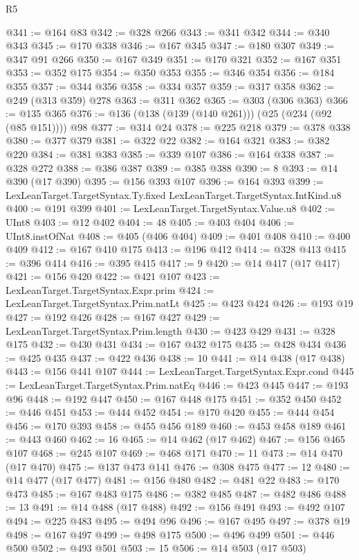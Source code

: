 \begin{lexlean}{R5}
\begin{coremodule}
{{{{{{{{{{{{{{{{{{{{{{{{{{{{{{{{{{{{{{{{{{{{{{{{{{{{{{{{{{{{{{@341 := @164 @83
@342 := @328 @266
@343 := @341 @342
@344 := @340 @343
@345 := @170 @338
@346 := @167 @345
@347 := @180 @307
@349 := @347 @91 @266
@350 := @167 @349
@351 := @170 @321
@352 := @167 @351
@353 := @352 @175
@354 := @350 @353
@355 := @346 @354
@356 := @184 @355
@357 := @344 @356
@358 := @334 @357
@359 := @317 @358
@362 := @249 (@313 @359) @278
@363 := @311 @362
@365 := @303 (@306 @363)
@366 := @135 @365
@376 := @136 (@138 (@139 (@140 @261))) (@25 (@234 (@92 (@85 @151)))) @98
@377 := @314 @24
@378 := @225 @218
@379 := @378 @338
@380 := @377 @379
@381 := @322 @22
@382 := @164 @321
@383 := @382 @220
@384 := @381 @383
@385 := @339 @107
@386 := @164 @338
@387 := @328 @272
@388 := @386 @387
@389 := @385 @388
@390 := 8
@393 := @14 @390 (@17 @390)
@395 := @156 @393 @107
@396 := @164 @393
@399 := LexLeanTarget.TargetSyntax.Ty.fixed LexLeanTarget.TargetSyntax.IntKind.u8
@400 := @191 @399
@401 := LexLeanTarget.TargetSyntax.Value.u8
@402 := UInt8
@403 := @12 @402
@404 := 48
@405 := @403 @404
@406 := UInt8.instOfNat
@408 := @405 (@406 @404)
@409 := @401 @408
@410 := @400 @409
@412 := @167 @410 @175
@413 := @196 @412
@414 := @328 @413
@415 := @396 @414
@416 := @395 @415
@417 := 9
@420 := @14 @417 (@17 @417)
@421 := @156 @420
@422 := @421 @107
@423 := LexLeanTarget.TargetSyntax.Expr.prim
@424 := LexLeanTarget.TargetSyntax.Prim.natLt
@425 := @423 @424
@426 := @193 @19
@427 := @192 @426
@428 := @167 @427
@429 := LexLeanTarget.TargetSyntax.Prim.length
@430 := @423 @429
@431 := @328 @175
@432 := @430 @431
@434 := @167 @432 @175
@435 := @428 @434
@436 := @425 @435
@437 := @422 @436
@438 := 10
@441 := @14 @438 (@17 @438)
@443 := @156 @441 @107
@444 := LexLeanTarget.TargetSyntax.Expr.cond
@445 := LexLeanTarget.TargetSyntax.Prim.natEq
@446 := @423 @445
@447 := @193 @96
@448 := @192 @447
@450 := @167 @448 @175
@451 := @352 @450
@452 := @446 @451
@453 := @444 @452
@454 := @170 @420
@455 := @444 @454
@456 := @170 @393
@458 := @455 @456 @189
@460 := @453 @458 @189
@461 := @443 @460
@462 := 16
@465 := @14 @462 (@17 @462)
@467 := @156 @465 @107
@468 := @245 @107
@469 := @468 @171
@470 := 11
@473 := @14 @470 (@17 @470)
@475 := @137 @473 @141
@476 := @308 @475
@477 := 12
@480 := @14 @477 (@17 @477)
@481 := @156 @480
@482 := @481 @22
@483 := @170 @473
@485 := @167 @483 @175
@486 := @382 @485
@487 := @482 @486
@488 := 13
@491 := @14 @488 (@17 @488)
@492 := @156 @491
@493 := @492 @107
@494 := @225 @483
@495 := @494 @96
@496 := @167 @495
@497 := @378 @19
@498 := @167 @497
@499 := @498 @175
@500 := @496 @499
@501 := @446 @500
@502 := @493 @501
@503 := 15
@506 := @14 @503 (@17 @503)
}}}}}}}}}}}}}}}}}}}}}}}}}}}}}}}}}}}}}}}}}}}}}}}}}}}}}}}}}}}}}}
\end{coremodule}
\end{lexlean}

